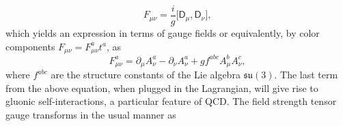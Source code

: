 \begin{equation*}
    F_{\mu\nu}=\frac{i}{g}\big[\textsf{D}_\mu,\textsf{D}_\nu\big],
\end{equation*}
which yields an expression in terms of gauge fields
or equivalently, by color components $F_{\mu\nu}=F_{\mu\nu}^at^a$, as
\begin{equation*}
    F_{\mu\nu}^a=\partial_\mu A_\nu^a-\partial_\nu A_\nu^a+gf^{abc}A_\mu^bA_\nu^c,
\end{equation*}
where $f^{abc}$ are the structure constants of the Lie algebra $\mathfrak{su}(3)$. The last term from the above equation, when plugged in the Lagrangian, will give rise to gluonic self-interactions, a particular feature of QCD. The field strength tensor gauge transforms in the usual manner as

